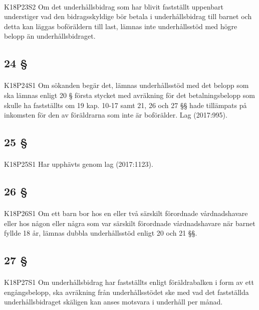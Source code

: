 \documentclass[a4paper,notitlepage,openany,10pt]{book}
\begin{document}
\paragraph*{}
{\tiny K18P23S2}
Om det underhållsbidrag som har blivit fastställt uppenbart understiger vad den bidragsskyldige bör betala i underhållsbidrag till barnet och detta kan läggas boföräldern till last, lämnas inte underhållsstöd med högre belopp än underhållsbidraget.
\subsection*{24 §}
\paragraph*{}
{\tiny K18P24S1}
Om sökanden begär det, lämnas underhållsstöd med det belopp som ska lämnas enligt 20 § första stycket med avräkning för det betalningsbelopp som skulle ha fastställts om 19 kap. 10-17 samt 21, 26 och 27 §§ hade tillämpats på inkomsten för den av föräldrarna som inte är boförälder.
Lag (2017:995).
\subsection*{25 §}
\paragraph*{}
{\tiny K18P25S1}
Har upphävts genom
lag (2017:1123).
\subsection*{26 §}
\paragraph*{}
{\tiny K18P26S1}
Om ett barn bor hos en eller två särskilt förordnade vårdnadshavare eller hos någon eller några som var särskilt förordnade vårdnadshavare när barnet fyllde 18 år, lämnas dubbla underhållsstöd enligt 20 och 21 §§.
\subsection*{27 §}
\paragraph*{}
{\tiny K18P27S1}
Om underhållsbidrag har fastställts enligt föräldrabalken i form av ett engångsbelopp, ska avräkning från underhållsstödet ske med vad det fastställda underhållsbidraget skäligen kan anses motsvara i underhåll per månad.
\end{document}
